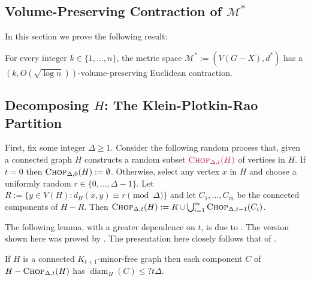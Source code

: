 \documentclass{patmorin}
\makeatletter
\renewcommand{\ge}{\geqslant}
\renewcommand{\le}{\leqslant}
\def\mathcolor#1#{\@mathcolor{#1}}
\def\@mathcolor#1#2#3{%
  \protect\leavevmode
  \begingroup
    \color#1{#2}#3%
  \endgroup
}
\newcommand{\mathdefin}[1]{\mathcolor{brightmaroon}{#1}}
\DeclareMathOperator{\diam}{diam}
\makeatother
\begin{document}


\subsection{Volume-Preserving Contraction of $\mathcal{M}^*$}

In this section we prove the following result:

\begin{lem}\label{dstar_contraction}
  For every integer $k\in\{1,\ldots,n\}$, the metric space $\mathcal{M}^*:=(V(G-X),d^*)$ has a $(k,O(\sqrt{\log n}))$-volume-preserving Euclidean contraction. 
\end{lem}

\subsection{Decomposing $H$: The Klein-Plotkin-Rao Partition}

First, fix some integer $\Delta \ge 1$.
Consider the following random process that, given a connected graph $H$ constructs a random subset $\mathdefin{\textsc{Chop}_{\Delta,t}(H)}$ of vertices in $H$. If $t=0$ then $\textsc{Chop}_{\Delta,0}(H):=\emptyset$.  Otherwise, select any vertex $x$ in $H$ and choose a uniformly random $r\in\{0,\ldots,\Delta-1\}$.  Let $R:=\{y\in V(H):d_{H}(x,y)\equiv r\pmod{\Delta}\}$ and let $C_1,\ldots,C_m$ be the connected components of $H-R$.  Then $\textsc{Chop}_{\Delta,t}(H):=R\cup\bigcup_{i=1}^m \textsc{Chop}_{\Delta,t-1}(C_i)$.


The following lemma, with a greater dependence on $t$, is due to \citet{klein.plotkin.ea:excluded}. The version shown here was proved by \citet{fakcharoenphol.talwar:improved}. The presentation here closely follows that of \citet{lee:simpler}.

\begin{lem}\label{component_diameter_h}
  If $H$ is a connected $K_{t+1}$-minor-free graph then each component $C$ of $H-\textsc{Chop}_{\Delta,t}(H)$ has $\diam_H(C)\le?t\Delta$.
\end{lem}
\end{document}
